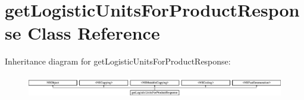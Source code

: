 \hypertarget{interfaceget_logistic_units_for_product_response}{}\section{get\+Logistic\+Units\+For\+Product\+Response Class Reference}
\label{interfaceget_logistic_units_for_product_response}
Inheritance diagram for get\+Logistic\+Units\+For\+Product\+Response\+:\begin{figure}[H]
\begin{center}
\leavevmode
\includegraphics[height=0.991150cm]{interfaceget_logistic_units_for_product_response}
\end{center}
\end{figure}
